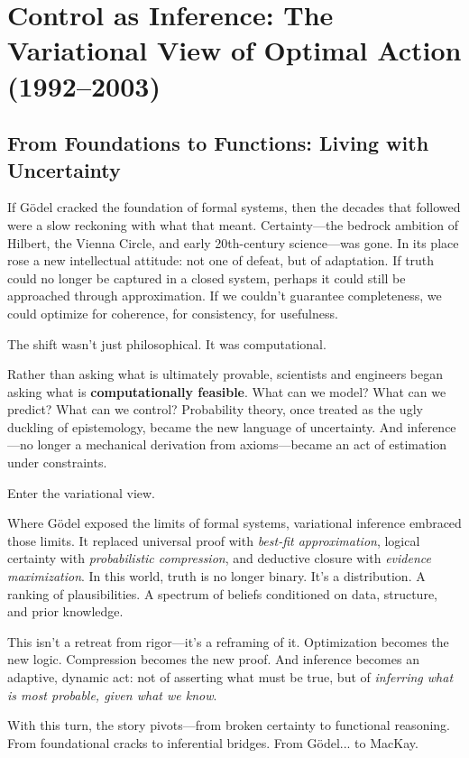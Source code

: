 \section{Control as Inference: The Variational View of Optimal Action (1992--2003)}

\subsection{From Foundations to Functions: Living with Uncertainty}

If Gödel cracked the foundation of formal systems, then the decades that followed were a slow reckoning with what that meant. Certainty—the bedrock ambition of Hilbert, the Vienna Circle, and early 20th-century science—was gone. In its place rose a new intellectual attitude: not one of defeat, but of adaptation. If truth could no longer be captured in a closed system, perhaps it could still be approached through approximation. If we couldn’t guarantee completeness, we could optimize for coherence, for consistency, for usefulness.

The shift wasn’t just philosophical. It was computational.

Rather than asking what is ultimately provable, scientists and engineers began asking what is \textbf{computationally feasible}. What can we model? What can we predict? What can we control? Probability theory, once treated as the ugly duckling of epistemology, became the new language of uncertainty. And inference—no longer a mechanical derivation from axioms—became an act of estimation under constraints.

Enter the variational view.

Where Gödel exposed the limits of formal systems, variational inference embraced those limits. It replaced universal proof with \emph{best-fit approximation}, logical certainty with \emph{probabilistic compression}, and deductive closure with \emph{evidence maximization}. In this world, truth is no longer binary. It’s a distribution. A ranking of plausibilities. A spectrum of beliefs conditioned on data, structure, and prior knowledge.

This isn’t a retreat from rigor—it’s a reframing of it. Optimization becomes the new logic. Compression becomes the new proof. And inference becomes an adaptive, dynamic act: not of asserting what must be true, but of \textit{inferring what is most probable, given what we know}.

\noindent
With this turn, the story pivots—from broken certainty to functional reasoning. From foundational cracks to inferential bridges. From Gödel... to MacKay.

